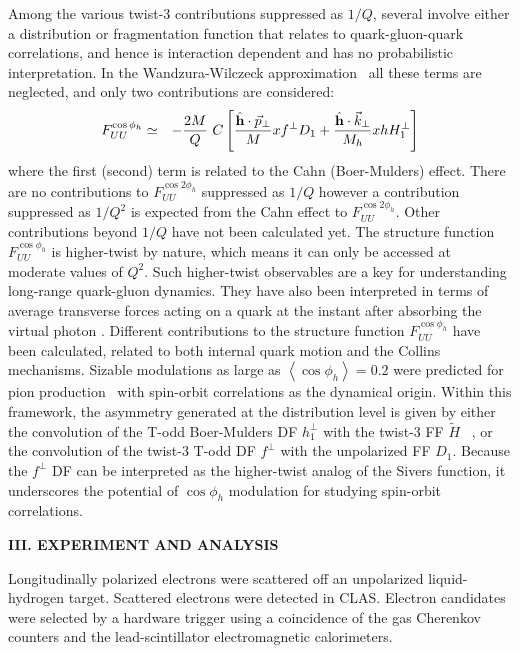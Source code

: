 \documentclass[aps,prl,twocolumn,showpacs,superscriptaddress,groupedaddress]{revtex4-1}  %
\newcommand{\FUUc}{F_{UU}^{\cos\phi_h}}
\newcommand{\FUUcc}{F_{UU}^{\cos2\phi_h}}
\newcommand{\kt}{\vec{k}_\perp}
\newcommand{\pt}{\vec{p}_\perp}
\newcommand{\ph}{\phi_h}
\begin{document}
Among the various twist-3 contributions suppressed as $1/Q$, several involve
either a distribution or fragmentation function that relates to
quark-gluon-quark correlations, and hence is interaction dependent and has no probabilistic
interpretation. In the Wandzura-Wilczeck approximation~\cite{Wandzura:1977qf}
all these terms are neglected, and only two contributions are considered: %
\begin{eqnarray} \nonumber
\label{Eq:cosphi}
\FUUc & \simeq & -\frac{2M}{Q}\  C\left[\frac{ \hat{\bf h} \cdot \pt}{M} xf^\perp D_1 +
\frac{\hat{\bf h} \cdot \kt}{M_h} 
xh H_1^\perp \right] \\
\end{eqnarray}
where the first (second) term is related to the Cahn (Boer-Mulders) effect.
There are no contributions to $\FUUcc$ suppressed as $1/Q$ however a contribution suppressed as $1/Q^2$ is expected from the Cahn effect to $\FUUcc$.
Other contributions beyond $1/Q$ have not been calculated yet.
The structure function $F^{\cos \ph}_{UU}$ is higher-twist by nature, which means it can only be accessed at moderate values of $Q^2$.
Such higher-twist observables are a key for understanding long-range quark-gluon dynamics.
They have also been interpreted in terms of average transverse forces acting on a quark at the instant after absorbing the virtual photon \cite{Burkardt:2008vd}.
Different contributions to the structure function  $F^{\cos \ph}_{UU}$ have been calculated, related to both internal quark motion and the Collins mechanisms.
Sizable modulations as large as $\left< \cos \phi_h \right> = 0.2$ were predicted for pion production~\cite{Anselmino:2005nn} with spin-orbit correlations as the dynamical origin.
Within this framework, the asymmetry generated at the distribution level is given by either the convolution of the T-odd Boer-Mulders DF $h_1^{\perp}$ with the twist-3 FF $\tilde{H}$ ~\cite{Bacchetta:2006tn}, or the convolution of the  twist-3 T-odd DF $f^\perp$ with the unpolarized FF $D_1$\cite{Metz:2004je}.
Because the $f^\perp$ DF can be interpreted as the higher-twist analog of the Sivers function, it underscores the potential of $\cos\phi_h$ modulation for studying spin-orbit correlations.


\begin{center}
\textbf{III. EXPERIMENT AND ANALYSIS} \par
\end{center}
Longitudinally polarized electrons were scattered off an unpolarized liquid-hydrogen target. 
Scattered electrons were detected in CLAS.
Electron candidates were selected by a hardware trigger using a coincidence of the gas Cherenkov counters and the lead-scintillator electromagnetic calorimeters. 
\end{document}
